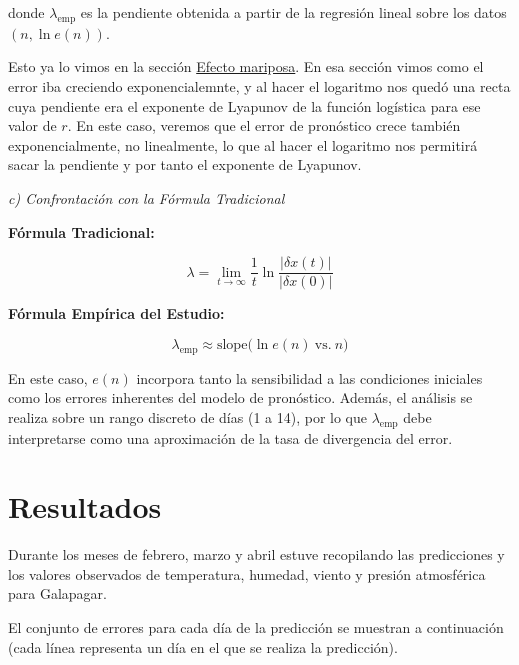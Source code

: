 \documentclass[
  10pt,
  a4paper,
  DIV=11,
  numbers=noendperiod,
  open=any]{scrreprt}
\numberwithin{equation}{chapter}
\numberwithin{equation}{section}
\renewcommand{\[}{\begin{equation}}
\renewcommand{\]}{\end{equation}}
\begin{document}
donde \(\lambda_{\text{emp}}\) es la pendiente obtenida a partir de la
regresión lineal sobre los datos \((n, \ln e(n))\).

Esto ya lo vimos en la sección \hyperref[sec-sensibilidad]{Efecto
mariposa}. En esa sección vimos como el error iba creciendo
exponencialemnte, y al hacer el logaritmo nos quedó una recta cuya
pendiente era el exponente de Lyapunov de la función logística para ese
valor de \(r\). En este caso, veremos que el error de pronóstico crece
también exponencialmente, no linealmente, lo que al hacer el logaritmo
nos permitirá sacar la pendiente y por tanto el exponente de Lyapunov.

\emph{c) Confrontación con la Fórmula Tradicional}

\textbf{Fórmula Tradicional:}

\begin{equation}
\lambda = \lim_{t \to \infty} \frac{1}{t} \ln \frac{|\delta x(t)|}{|\delta x(0)|}
\end{equation}

\textbf{Fórmula Empírica del Estudio:}

\begin{equation}
\lambda_{\text{emp}} \approx \text{slope}\bigl(\ln e(n)\ \text{vs.}\ n\bigr)
\end{equation}

En este caso, \(e(n)\) incorpora tanto la sensibilidad a las condiciones
iniciales como los errores inherentes del modelo de pronóstico. Además,
el análisis se realiza sobre un rango discreto de días (1 a 14), por lo
que \(\lambda_{\text{emp}}\) debe interpretarse como una aproximación de
la tasa de divergencia del error.

\section{Resultados}\label{resultados-2}

Durante los meses de febrero, marzo y abril estuve recopilando las
predicciones y los valores observados de temperatura, humedad, viento y
presión atmosférica para Galapagar.

El conjunto de errores para cada día de la predicción se muestran a
continuación (cada línea representa un día en el que se realiza la
predicción).
\end{document}
